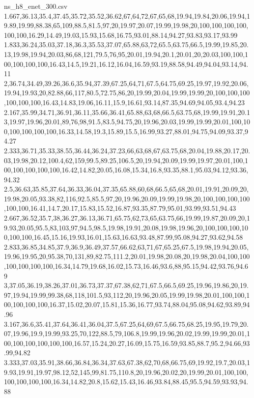 \begin{filecontents*}[overwrite]{ns_h8_enet_300.csv}
1.667,36.13,35.4,37.45,35.72,35.52,36.62,67,64,72,67,65,68,19.94,19.84,20.06,19.94,19.89,19.99,88.38,65,109,88.5,81.5,97,20,19.97,20.07,19.99,19.98,20,100,100,100,100,100,100,16.29,14.49,19.03,15.93,15.68,16.75,93.01,88.14,94.27,93.83,93.17,93.99
1.833,36.24,35.03,37.18,36.3,35.53,37.07,65.88,63,72,65.5,63.75,66.5,19.99,19.85,20.13,19.98,19.94,20.03,86,68,121,79.5,76,95,20.01,19.94,20.1,20.01,20,20.03,100,100,100,100,100,100,16.43,14.5,19.21,16.12,16.04,16.59,93.19,88.58,94.49,94.04,93.14,94.11
2,36.74,34.49,39.26,36.6,35.94,37.39,67.25,64,71,67.5,64.75,69.25,19.97,19.92,20.06,19.94,19.93,20,82.88,66,117,80.5,72.75,86,20,19.99,20.04,19.99,19.99,20,100,100,100,100,100,100,16.43,14.83,19.06,16.11,15.9,16.61,93.14,87.35,94.69,94.05,93.4,94.23
2.167,35.99,34.71,36.91,36.11,35.66,36.41,65.88,63,68,66.5,63.75,68,19.99,19.91,20.13,19.97,19.96,20.01,89,76,98,91.5,83.5,94.75,20,19.96,20.03,19.99,19.99,20.01,100,100,100,100,100,100,16.33,14.58,19.3,15.89,15.5,16.99,93.27,88.01,94.75,94.09,93.37,94.27
2.333,36.71,35.33,38.55,36.44,36.24,37.23,66,63,68,67,63.75,68,20.04,19.88,20.17,20.03,19.98,20.12,100.4,62,159,99.5,89.25,106.5,20,19.94,20.09,19.99,19.97,20.01,100,100,100,100,100,100,16.42,14.82,20.05,16.08,15.34,16.8,93.35,88.1,95.03,94.12,93.36,94.32
2.5,36.63,35.85,37.64,36.33,36.04,37.35,65.88,60,68,66.5,65,68,20.01,19.91,20.09,20,19.98,20.05,93.38,82,116,92.5,85.5,97,20,19.96,20.09,19.99,19.98,20,100,100,100,100,100,100,16.41,14.7,20.17,15.83,15.52,16.87,93.35,87.79,95.01,93.99,93.51,94.43
2.667,36.52,35.7,38,36.27,36.13,36.71,65.75,62,73,65,63.75,66,19.99,19.87,20.09,20,19.93,20.05,95.5,83,103,97,94.5,98.5,19.98,19.91,20.08,19.98,19.96,20,100,100,100,100,100,100,16.45,15.16,19.93,16.01,15.63,16.63,93.48,87.99,95.08,94.27,93.62,94.58
2.833,36.85,34.85,37.9,36.9,36.49,37.57,66.62,63,71,67,65.25,67.5,19.98,19.94,20.05,19.96,19.95,20,95.38,70,131,89,82.75,111.2,20.01,19.98,20.08,20,19.98,20.04,100,100,100,100,100,100,16.34,14.79,19.68,16.02,15.73,16.46,93.6,88,95.15,94.42,93.76,94.69
3,37.05,36.19,38.26,37.01,36.73,37.37,67.38,62,71,67.5,66.5,69.25,19.96,19.86,20,19.97,19.94,19.99,99.38,68,118,101.5,93,112,20,19.96,20.05,19.99,19.98,20.01,100,100,100,100,100,100,16.37,15.02,20.07,15.81,15.36,16.77,93.74,88.04,95.08,94.62,93.89,94.96
3.167,36.6,35.41,37.64,36.41,36.04,37.5,67.25,64,69,67.5,66.75,68.25,19.95,19.79,20.07,19.96,19.9,19.99,93.25,70,122,88.5,79,106.8,19.99,19.96,20.02,19.99,19.99,20.01,100,100,100,100,100,100,16.57,15.24,20.27,16.09,15.75,16.59,93.85,88.7,95.2,94.66,93.99,94.82
3.333,37.03,35.91,38.66,36.84,36.34,37.63,67.38,62,70,68,66.75,69,19.92,19.7,20.03,19.93,19.91,19.97,98.12,52,145,99,81.75,110.8,20,19.96,20.02,20,19.99,20.01,100,100,100,100,100,100,16.34,14.82,20.8,15.62,15.43,16.46,93.84,88.45,95.5,94.59,93.93,94.88

\end{filecontents*}
